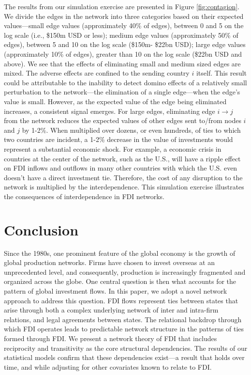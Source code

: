 \documentclass[reqno,onecolumn,letterpaper,12pt]{article}
\begin{document}
The results from our simulation exercise are presented in Figure \ref{fig:contagion}. We divide the edges in the network into three categories based on their expected values---small edge values (approximately 40\% of edges), between 0 and 5 on the log scale (i.e., \$150m USD or less); medium edge values (approximately 50\% of edges), between 5 and 10 on the log scale (\$150m- \$22bn USD); large edge values (approximately 10\% of edges), greater than 10 on the log scale (\$22bn USD and above). We see that the effects of eliminating small and medium sized edges are mixed. The adverse effects are confined to the sending country $i$ itself. This result could be attributable to the inability to detect domino effects of a relatively small perturbation to the network---the elimination of a single edge---when the edge's value is small. However, as the expected value of the edge being eliminated increases, a consistent signal emerges. For large edges, eliminating edge $i \rightarrow j$ from the network reduces the expected values of other edges sent to/from nodes $i$ and $j$ by 1-2\%. When multiplied over dozens, or even hundreds, of ties to which two countries are incident, a 1-2\% decrease in the value of investments would represent a substantial economic shock. For example, a economic crisis in countries at the center of the network, such as the U.S., will have a ripple effect on FDI inflows and outflows in many other countries with which the U.S. even doesn't have a direct investment tie. Therefore, the cost of any disruption to the network is multiplied by the interdependence. This simulation exercise illustrates the consequences of interdependence in FDI networks.









\section{Conclusion}

Since the 1980s, one prominent feature of the global economy is the growth of global production networks. Firms have chosen to invest overseas at an unprecedented level, and consequently, production is increasingly fragmented and organized across the globe. One central question is then what accounts for the pattern of global investment flows. In this paper, we adopt a novel network approach to address this question. FDI flows represent ties between states that arise through both a complex underlying network of inter and intra-firm relations, and legal agreements between states. The relational backdrop through which FDI operates leads to predictable network structure in the patterns of ties formed through FDI. We present a network theory of FDI that includes reciprocity and transitivity as the core structural dependencies. The results of our statistical models confirm that these dependencies exist---a result that holds over time, and while adjusting for other covariates known to relate to FDI.
\end{document}
